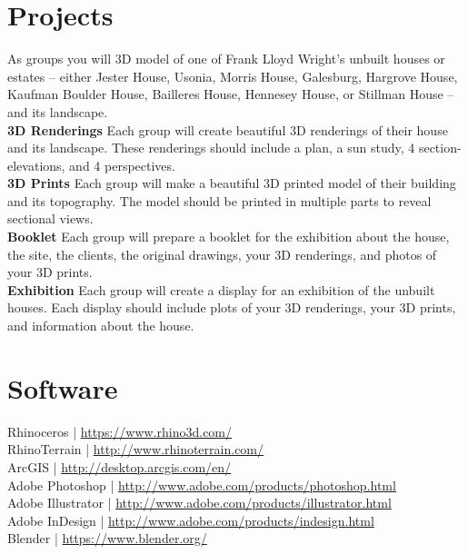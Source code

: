 \documentclass[11pt,article,oneside]{memoir}
\begin{document}

\section{Projects}
As groups %
you will 3D model of one of 
Frank Lloyd Wright's unbuilt houses or estates
-- either Jester House, Usonia, Morris House, Galesburg, 
Hargrove House, Kaufman Boulder House, Bailleres House, 
Hennesey House, or Stillman House -- 
and its landscape.\\

\noindent \textbf{3D Renderings}
Each group will create beautiful 3D renderings
of their house and its landscape. 
These renderings should include 
a plan,
a sun study, 
4 section-elevations, 
and 4 perspectives.\\

\noindent \textbf{3D Prints}
Each group will make a beautiful 3D printed model 
of their building and its topography.
The model should be printed in multiple parts
to reveal sectional views.\\

\noindent \textbf{Booklet}
Each group will prepare a booklet for the exhibition 
about the house, the site, the clients, the original drawings, 
your 3D renderings, and photos of your 3D prints.\\

\noindent \textbf{Exhibition}
Each group will create a display for 
an exhibition of the unbuilt houses.
Each display should include
plots of your 3D renderings,
your 3D prints, and 
information about the house.\\

\clearpage

\section{Software}
Rhinoceros | \url{https://www.rhino3d.com/}\\
RhinoTerrain | \url{http://www.rhinoterrain.com/}\\
ArcGIS | \url{http://desktop.arcgis.com/en/}\\
Adobe Photoshop | \url{http://www.adobe.com/products/photoshop.html}\\
Adobe Illustrator | \url{http://www.adobe.com/products/illustrator.html}\\
Adobe InDesign | \url{http://www.adobe.com/products/indesign.html}\\
Blender | \url{https://www.blender.org/}\\
\end{document}
